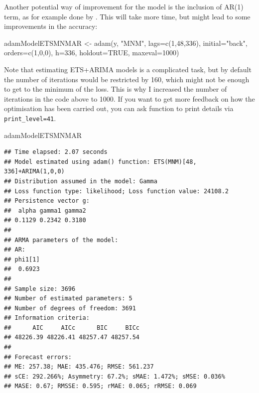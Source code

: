 \documentclass[
]{book}
\newenvironment{Shaded}{\begin{snugshade}}{\end{snugshade}}
\newcommand{\AttributeTok}[1]{\textcolor[rgb]{0.77,0.63,0.00}{#1}}
\newcommand{\ConstantTok}[1]{\textcolor[rgb]{0.00,0.00,0.00}{#1}}
\newcommand{\DecValTok}[1]{\textcolor[rgb]{0.00,0.00,0.81}{#1}}
\newcommand{\FunctionTok}[1]{\textcolor[rgb]{0.00,0.00,0.00}{#1}}
\newcommand{\NormalTok}[1]{#1}
\newcommand{\OtherTok}[1]{\textcolor[rgb]{0.56,0.35,0.01}{#1}}
\newcommand{\StringTok}[1]{\textcolor[rgb]{0.31,0.60,0.02}{#1}}
\theoremstyle{definition}
\theoremstyle{definition}
\theoremstyle{definition}
\theoremstyle{definition}
\theoremstyle{remark}
\begin{document}
Another potential way of improvement for the model is the inclusion of AR(1) term, as for example done by \citet{Taylor2010}. This will take more time, but might lead to some improvements in the accuracy:

\begin{Shaded}
\begin{Highlighting}[]
\NormalTok{adamModelETSMNMAR }\OtherTok{\textless{}{-}} \FunctionTok{adam}\NormalTok{(y, }\StringTok{"MNM"}\NormalTok{, }\AttributeTok{lags=}\FunctionTok{c}\NormalTok{(}\DecValTok{1}\NormalTok{,}\DecValTok{48}\NormalTok{,}\DecValTok{336}\NormalTok{),}
                          \AttributeTok{initial=}\StringTok{"back"}\NormalTok{, }\AttributeTok{orders=}\FunctionTok{c}\NormalTok{(}\DecValTok{1}\NormalTok{,}\DecValTok{0}\NormalTok{,}\DecValTok{0}\NormalTok{),}
                          \AttributeTok{h=}\DecValTok{336}\NormalTok{, }\AttributeTok{holdout=}\ConstantTok{TRUE}\NormalTok{, }\AttributeTok{maxeval=}\DecValTok{1000}\NormalTok{)}
\end{Highlighting}
\end{Shaded}

Note that estimating ETS+ARIMA models is a complicated task, but by default the number of iterations would be restricted by 160, which might not be enough to get to the minimum of the loss. This is why I increased the number of iterations in the code above to 1000. If you want to get more feedback on how the optimisation has been carried out, you can ask function to print details via \texttt{print\_level=41}.

\begin{Shaded}
\begin{Highlighting}[]
\NormalTok{adamModelETSMNMAR}
\end{Highlighting}
\end{Shaded}

\begin{verbatim}
## Time elapsed: 2.07 seconds
## Model estimated using adam() function: ETS(MNM)[48, 336]+ARIMA(1,0,0)
## Distribution assumed in the model: Gamma
## Loss function type: likelihood; Loss function value: 24108.2
## Persistence vector g:
##  alpha gamma1 gamma2 
## 0.1129 0.2342 0.3180 
## 
## ARMA parameters of the model:
## AR:
## phi1[1] 
##  0.6923 
## 
## Sample size: 3696
## Number of estimated parameters: 5
## Number of degrees of freedom: 3691
## Information criteria:
##      AIC     AICc      BIC     BICc 
## 48226.39 48226.41 48257.47 48257.54 
## 
## Forecast errors:
## ME: 257.38; MAE: 435.476; RMSE: 561.237
## sCE: 292.266%; Asymmetry: 67.2%; sMAE: 1.472%; sMSE: 0.036%
## MASE: 0.67; RMSSE: 0.595; rMAE: 0.065; rRMSE: 0.069
\end{verbatim}
\end{document}
